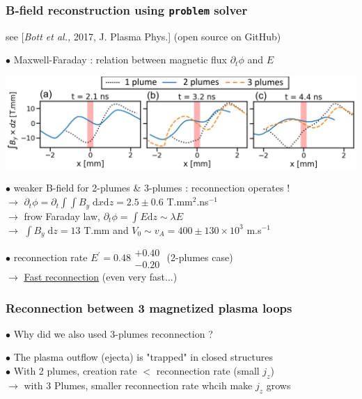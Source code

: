 \documentclass{beamer}
\newcommand{\D}{{\mathrm d}}
\begin{document}
\begin{frame}
\frametitle{B-field reconstruction using \texttt{problem} solver}

see [\textit{Bott et al.,} 2017, J. Plasma Phys.] (open source on GitHub)

$\bullet$ Maxwell-Faraday : relation between magnetic flux $\partial_t \phi$ and $E$ \\

\begin{center}
\includegraphics[width=1.0\textwidth]{problem.png}
\end{center}

$\bullet$ weaker B-field for 2-plumes \& 3-plumes : reconnection operates ! \\
$\to$ $\partial_t \phi = \partial_t \int \!\!\! \int B_y \; \D x \D z = 2.5 \pm 0.6$ T.mm$^2$.ns$^{-1}$ \\
$\to$ frow Faraday law, $\partial_t \phi = \int E \D z \sim \lambda E$ \\
$\to$ $\int B_y \; \D z = 13$ T.mm and $V_0 \sim v_A = 400 \pm 130 \times 10^3$ m.s$^{-1}$ \\

\bigskip

$\bullet$ reconnection rate $E^{\prime} = 0.48 \substack{+0.40 \\ -0.20}$ (2-plumes case) \\
$\to$ \underline{Fast reconnection} (even very fast...) \\

\end{frame}



\begin{frame}
\frametitle{Reconnection between 3 magnetized plasma loops}

$\bullet$ Why did we also used 3-plumes reconnection ?
\begin{center}

\end{center}

$\bullet$ The plasma outflow (ejecta) is "trapped" in closed structures \\
$\bullet$ With 2 plumes, creation rate $<$ reconnection rate (small $j_z$) \\
$\to$ with 3 Plumes, smaller reconnection rate whcih make $j_z$ grows \\

\end{frame}
\end{document}
